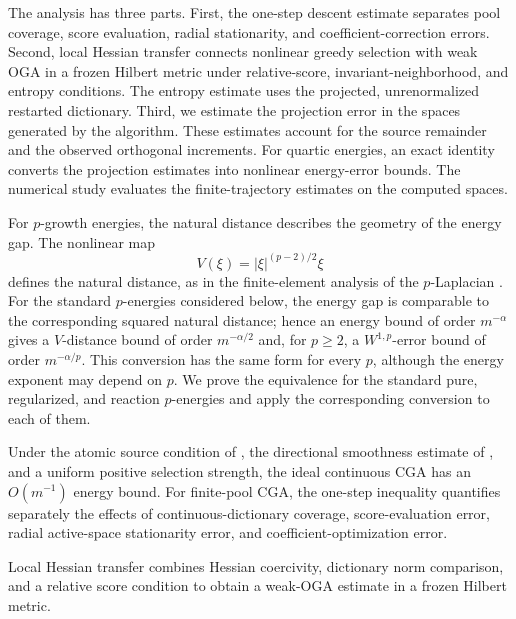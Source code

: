 The analysis has three parts. First, the one-step descent estimate separates pool coverage, score evaluation, radial stationarity, and coefficient-correction errors. Second, local Hessian transfer connects nonlinear greedy selection with weak OGA in a frozen Hilbert metric under relative-score, invariant-neighborhood, and entropy conditions. The entropy estimate uses the projected, unrenormalized restarted dictionary. Third, we estimate the projection error in the spaces generated by the
algorithm. These estimates account for the source remainder and the
observed orthogonal increments. For quartic energies, an exact identity
converts the projection estimates into nonlinear energy-error bounds. The numerical study evaluates the finite-trajectory estimates on the computed spaces.

For \(p\)-growth energies, the natural distance describes the geometry of the energy gap. The
nonlinear map
\[
  V(\xi)=|\xi|^{(p-2)/2}\xi
\]
defines the natural distance, as in the finite-element analysis of the \(p\)-Laplacian
\citep{BarrettLiu1993,DieningKreuzer2008,LeePark2025}. For the standard \(p\)-energies considered below, the energy gap is
comparable to the corresponding squared natural distance; hence an energy bound of order \(m^{-\alpha}\) gives a \(V\)-distance bound of order
\(m^{-\alpha/2}\) and, for \(p\geq2\), a \(W^{1,p}\)-error bound of order \(m^{-\alpha/p}\). This
conversion has the same form for every \(p\), although the energy exponent may depend on \(p\). We
prove the equivalence for the standard pure, regularized, and reaction \(p\)-energies and apply the
corresponding conversion to each of them.

Under the atomic source condition of , the directional smoothness estimate of , and a uniform positive selection strength, the ideal continuous CGA has an \(O(m^{-1})\) energy bound. For finite-pool CGA, the one-step inequality quantifies separately the
effects of continuous-dictionary coverage, score-evaluation error,
radial active-space stationarity error, and coefficient-optimization error.

Local Hessian transfer combines Hessian coercivity, dictionary norm
comparison, and a relative score condition to obtain a weak-OGA
estimate in a frozen Hilbert metric.

